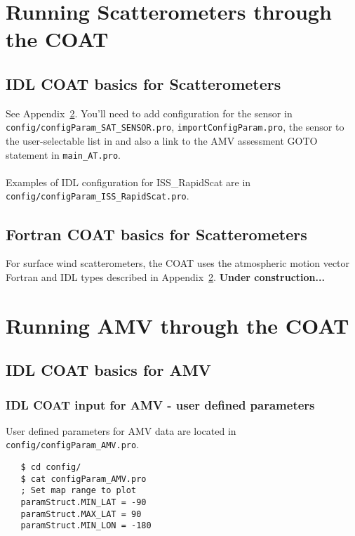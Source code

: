 \documentclass[10pt]{report}
\begin{document}

\begin{appendices}
\chapter{Running Scatterometers through the COAT}
\section{IDL COAT basics for Scatterometers}
See Appendix~\ref{chpt:AMVCOAT}.  You'll need to add configuration for the 
sensor in {\tt config/configParam\_SAT\_SENSOR.pro}, 
{\tt importConfigParam.pro}, the 
sensor to the user-selectable list in and also a link 
to the AMV assessment GOTO statement in {\tt main\_AT.pro}.  
~~\\~~\\
Examples of IDL 
configuration for ISS\_RapidScat are in {\tt config/configParam\_ISS\_RapidScat.pro}.
\section{Fortran COAT basics for Scatterometers}

For surface wind scatterometers, the COAT uses the atmospheric motion vector 
Fortran and IDL types described in Appendix~\ref{chpt:AMVCOAT}.  
{\bf Under construction...}

\chapter{Running AMV through the COAT}\label{chpt:AMVCOAT}
\section{IDL COAT basics for AMV}
\subsection{IDL COAT input for AMV - user defined parameters}
User defined parameters for AMV data are located in {\tt config/configParam\_AMV.pro}.
\begin{verbatim}
   $ cd config/
   $ cat configParam_AMV.pro
   ; Set map range to plot
   paramStruct.MIN_LAT = -90
   paramStruct.MAX_LAT = 90
   paramStruct.MIN_LON = -180


\end{verbatim}
\end{appendices}
\end{document}
